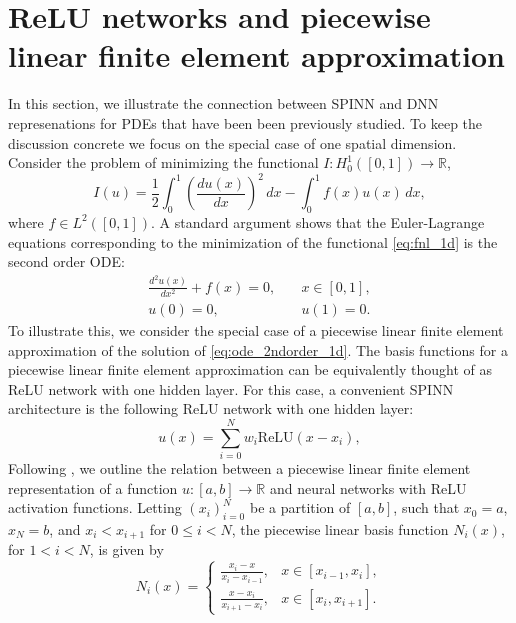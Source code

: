 \documentclass[12pt]{article}
\begin{document}
\section{ReLU networks and piecewise linear finite element approximation} \label{app:relu_fem_1d}
In this section, we illustrate the connection between SPINN and DNN represenations for PDEs that have been been previously studied. To keep the discussion concrete we focus on the special case of one spatial dimension. Consider the problem of minimizing the functional $I:H^1_0([0,1]) \to \mathbb{R}$,
\begin{equation} \label{eq:fnl_1d}
I(u) = \frac{1}{2}\int_0^1 \left(\frac{du(x)}{dx}\right)^2 \,dx - \int_0^1 f(x)u(x) \,dx,
\end{equation}
where $f \in L^2([0,1])$. A standard argument shows that the Euler-Lagrange equations corresponding to the minimization of the functional \eqref{eq:fnl_1d} is the second order ODE:
\begin{equation} \label{eq:ode_2ndorder_1d}
\begin{split}
\frac{d^2u(x)}{dx^2} + f(x) = 0, & \quad x \in [0,1],\\
u(0) = 0, & \quad u(1) = 0.
\end{split}
\end{equation}
To illustrate this, we consider the special case of a piecewise linear finite element approximation of the solution of \eqref{eq:ode_2ndorder_1d}. The basis functions for a piecewise linear finite element approximation can be equivalently thought of as ReLU network with one hidden layer. For this case, a convenient SPINN architecture is the following ReLU network with one hidden layer:
\begin{equation} \label{eq:spinn_1d}
u(x) = \sum_{i=0}^N w_i \text{ReLU}(x - x_i),
\end{equation}
Following \cite{HLXZ2020}, we outline the relation between a piecewise linear finite element representation of a function $u:[a,b] \to \mathbb{R}$ and neural networks with ReLU activation functions. Letting $(x_i)_{i=0}^N$ be a partition of $[a,b]$, such that $x_0 = a$, $x_N = b$, and $x_i < x_{i+1}$ for $0 \le i < N$, the piecewise linear basis function $N_i(x)$, for $1 < i < N$, is given by
\begin{equation} \label{eq:hat_function_fem_1d}
N_i(x) = \begin{cases}
\frac{x_i - x}{x_i - x_{i-1}}, & x \in [x_{i-1},x_i],\\
\frac{x - x_i}{x_{i+1} - x_i}, & x \in [x_i, x_{i+1}].
\end{cases}
\end{equation}
\end{document}
